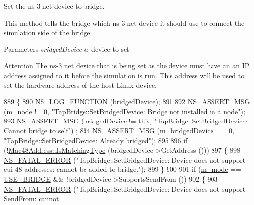 Set the ns-\/3 net device to bridge. 

This method tells the bridge which ns-\/3 net device it should use to connect the simulation side of the bridge.


\begin{DoxyParams}{Parameters}
{\em bridged\+Device} & device to set\\
\hline
\end{DoxyParams}
\begin{DoxyAttention}{Attention}
The ns-\/3 net device that is being set as the device must have an an IP address assigned to it before the simulation is run. This address will be used to set the hardware address of the host Linux device. 
\end{DoxyAttention}

\begin{DoxyCode}
889 \{
890   \hyperlink{log-macros-disabled_8h_a90b90d5bad1f39cb1b64923ea94c0761}{NS\_LOG\_FUNCTION} (bridgedDevice);
891 
892   \hyperlink{assert_8h_aff5ece9066c74e681e74999856f08539}{NS\_ASSERT\_MSG} (\hyperlink{classns3_1_1TapBridge_aab85ad5d27b8de91e7a02e8d8ee4332e}{m\_node} != 0, \textcolor{stringliteral}{"TapBridge::SetBridgedDevice:  Bridge not installed in a
       node"});
893   \hyperlink{assert_8h_aff5ece9066c74e681e74999856f08539}{NS\_ASSERT\_MSG} (bridgedDevice != \textcolor{keyword}{this}, \textcolor{stringliteral}{"TapBridge::SetBridgedDevice:  Cannot bridge to self"})
      ;
894   \hyperlink{assert_8h_aff5ece9066c74e681e74999856f08539}{NS\_ASSERT\_MSG} (\hyperlink{classns3_1_1TapBridge_ac4ba97368116b628d632d318d5562420}{m\_bridgedDevice} == 0, \textcolor{stringliteral}{"TapBridge::SetBridgedDevice:  Already
       bridged"});
895 
896   \textcolor{keywordflow}{if} (!\hyperlink{classns3_1_1Mac48Address_a55cc1e3c6aa63fd1a4f8f7d9be4ae182}{Mac48Address::IsMatchingType} (bridgedDevice->GetAddress ()))
897     \{
898       \hyperlink{group__fatal_ga5131d5e3f75d7d4cbfd706ac456fdc85}{NS\_FATAL\_ERROR} (\textcolor{stringliteral}{"TapBridge::SetBridgedDevice: Device does not support eui 48 addresses:
       cannot be added to bridge."});
899     \}
900 
901   \textcolor{keywordflow}{if} (\hyperlink{classns3_1_1TapBridge_aaae30bc9d5dd36e3a4d569cf9bcf40eb}{m\_mode} == \hyperlink{classns3_1_1TapBridge_acac8d3ebe259ddfa9cd369515f04618da33daa0eda93d6ec20fc491d7c440fc8d}{USE\_BRIDGE} && !bridgedDevice->SupportsSendFrom ())
902     \{
903       \hyperlink{group__fatal_ga5131d5e3f75d7d4cbfd706ac456fdc85}{NS\_FATAL\_ERROR} (\textcolor{stringliteral}{"TapBridge::SetBridgedDevice: Device does not support SendFrom: cannot
}
\end{DoxyCode}
